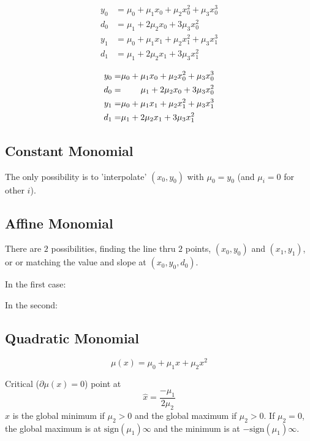 \begin{align}\label{eq:hermite-eqns}
 y_0 & = \mu_0 + \mu_1 x_0 + \mu_2 x_0^2 + \mu_3 x_0^3 \\
 d_0 & = \mu_1 + 2 \mu_2 x_0 + 3 \mu_3 x_0^2 \nonumber \\
 y_1 & = \mu_0 + \mu_1 x_1 + \mu_2 x_1^2 + \mu_3 x_1^3 \nonumber \\
 d_1 & = \mu_1 + 2 \mu_2 x_1 + 3 \mu_3 x_1^2 \nonumber 
\end{align}

\begin{align}
 y_0 = &\mu_0 + \mu_1 x_0 + \mu_2 x_0^2 + \mu_3 x_0^3 \\
 d_0 = &\specialcell{\hfill \mu_1 + 2 \mu_2 x_0 + 3 \mu_3 x_0^2} \nonumber \\
 y_1 = &\mu_0 + \mu_1 x_1 + \mu_2 x_1^2 + \mu_3 x_1^3 \nonumber \\
 d_1 = &\specialcell{{\hfill \mu_1 + 2 \mu_2 x_1 + 3 \mu_3 x_1^2}} \nonumber 
\end{align}

\subsection{Constant Monomial}

The only possibility is to 'interpolate' $(x_0,y_0)$ with
$\mu_0 = y_0$ (and $\mu_i = 0$ for other $i$). 

\subsection{Affine Monomial}

There are $2$ possibilities, finding the line thru $2$ points,
$(x_0,y_0)$ and $(x_1,y_1)$, or or matching the value and slope at
$(x_0,y_0,d_0)$.

In the first case:


In the second:


\subsection{Quadratic Monomial}

\begin{equation}
\mu(x) = \mu_0 + \mu_1 x + \mu_2 x^2
\end{equation}

Critical ($\partial\mu(x) = 0$) point at
\begin{equation}
\hat{x} = \frac{-\mu_1}{2 \mu_2}
\end{equation}
$\hat{x}$ is the global minimum if $\mu_2>0$ 
and the global maximum if $\mu_2>0$.
If $\mu_2 = 0$, the global maximum is at 
$\text{sign}(\mu_1)\infty$
and the minimum is at $-\text{sign}(\mu_1)\infty$.

